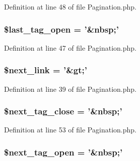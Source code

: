 Definition at line 48 of file Pagination.\-php.

\hypertarget{class_c_i___pagination_ac7e807e8227dd4528c2b315424d126db}{
\subsubsection[{\$last\-\_\-tag\-\_\-open}]{\setlength{\rightskip}{0pt plus 5cm}\$last\-\_\-tag\-\_\-open = '\&nbsp;'}}\label{class_c_i___pagination_ac7e807e8227dd4528c2b315424d126db}


Definition at line 47 of file Pagination.\-php.

\hypertarget{class_c_i___pagination_ae3962413e69384df902aedf7484ddefe}{
\subsubsection[{\$next\-\_\-link}]{\setlength{\rightskip}{0pt plus 5cm}\$next\-\_\-link = '\&{\bf gt};'}}\label{class_c_i___pagination_ae3962413e69384df902aedf7484ddefe}


Definition at line 39 of file Pagination.\-php.

\hypertarget{class_c_i___pagination_aa3dc112ae0edd3eb76d13eb3f5a57d02}{
\subsubsection[{\$next\-\_\-tag\-\_\-close}]{\setlength{\rightskip}{0pt plus 5cm}\$next\-\_\-tag\-\_\-close = '\&nbsp;'}}\label{class_c_i___pagination_aa3dc112ae0edd3eb76d13eb3f5a57d02}


Definition at line 53 of file Pagination.\-php.

\hypertarget{class_c_i___pagination_a0345e4646ae630d4d95f98de048e4572}{
\subsubsection[{\$next\-\_\-tag\-\_\-open}]{\setlength{\rightskip}{0pt plus 5cm}\$next\-\_\-tag\-\_\-open = '\&nbsp;'}}\label{class_c_i___pagination_a0345e4646ae630d4d95f98de048e4572}


